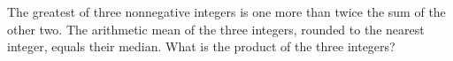 The greatest of three nonnegative integers is one more than twice the sum of the other two. The arithmetic mean of the three integers, rounded to the nearest integer, equals their median. What is the product of the three integers?
